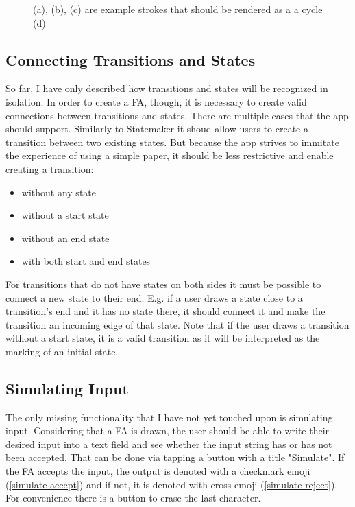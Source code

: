 \begin{figure}
    \centering
    \caption{(a), (b), (c) are example strokes that should be rendered as a a cycle (d)}\label{cycle}
\end{figure}

\subsection{Connecting Transitions and States}

So far, I have only described how transitions and states will be recognized in isolation. In order to create a FA, though, it is necessary to create valid connections between transitions and states. There are multiple cases that the app should support. Similarly to Statemaker \cite{state-maker} it shoud allow users to create a transition between two existing states. But because the app strives to immitate the experience of using a simple paper, it should be less restrictive and enable creating a transition:
\begin{itemize}
    \item without any state
    \item without a start state
    \item without an end state
    \item with both start and end states
\end{itemize}
For transitions that do not have states on both sides it must be possible to connect a new state to their end. E.g. if a user draws a state close to a transition's end and it has no state there, it should connect it and make the transition an incoming edge of that state. Note that if the user draws a transition without a start state, it is a valid transition as it will be interpreted as the marking of an initial state.

\subsection{Simulating Input}

The only missing functionality that I have not yet touched upon is simulating input. Considering that a FA is drawn, the user should be able to write their desired input into a text field and see whether the input string has or has not been accepted. That can be done via tapping a button with a title "Simulate". If the FA accepts the input, the output is denoted with a checkmark emoji (\ref{simulate-accept}) and if not, it is denoted with cross emoji (\ref{simulate-reject}). For convenience there is a button to erase the last character.

